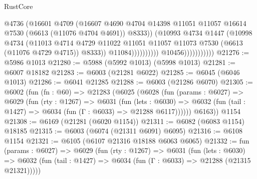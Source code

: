 \begin{lexlean}{RustCore}
\begin{coremodule}
                                            @4736
                                            (@16601
                                              @4709
                                              (@16607
                                                @4690
                                                @4704
                                                @14398
                                                @11051
                                                @11057
                                                @16614
                                                @7530
                                                (@6613 (@11076 @4704 @4691))
                                                @8333))
                                            (@10993
                                              @4734
                                              @1447
                                              (@10998
                                                @4734
                                                (@11013
                                                  @4714
                                                  @4729
                                                  @11022
                                                  @11051
                                                  @11057
                                                  @11073
                                                  @7530
                                                  (@6613 (@11076 @4729 @4715))
                                                  @8333))
                                              @11084))))))))))
                          @10456)))))))))))
@21276 := @5986 @1013
@21280 := @5988 (@5992 @1013) (@5998 @1013)
@21281 := @6007 @18182
@21283 := @6003 (@21281 @6022)
@21285 := @6045 (@6046 @1013)
@21286 := @6041 @21285
@21288 := @6003 (@21286 @6070)
@21305 := @6002
    (fun (fn : @60) =>
    @21283
      (@6025
        (@6028
          (fun (params : @6027) =>
          @6029
            (fun (rty : @1267) =>
            @6031
              (fun (lets : @6030) =>
              @6032 (fun (tail : @1427) => @6034 (fun (Γ : @6033) => @21288 @6117))))))
        @6163))
    @1154
@21308 := @6169 (@21281 (@6020 @1154))
@21311 := @6082 (@6083 @1154) @18185
@21315 := @6003 (@6074 (@21311 @6091) @6095)
@21316 := @6108 @1154
@21321 := @6105 (@6107 @21316 @18188 @6063 @6065)
@21332 := fun (params : @6027) =>
  @6029
    (fun (rty : @1267) =>
    @6031
      (fun (lets : @6030) =>
      @6032 (fun (tail : @1427) => @6034 (fun (Γ : @6033) => @21288 (@21315 @21321)))))

\end{coremodule}
\end{lexlean}
